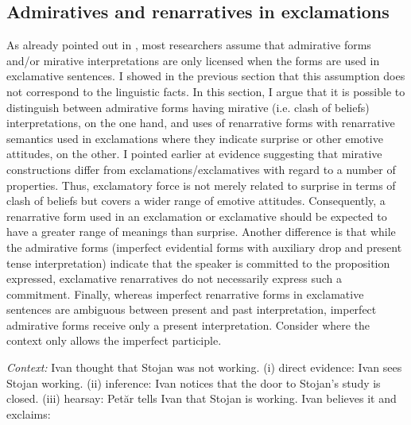 \documentclass[output=paper,
colorlinks,
citecolor=brown,
newtxmath
]{langscibook}
\begin{document}
\subsection{Admiratives and renarratives in exclamations}\label{sec:renarr_admir}

As already pointed out in , most researchers assume that admirative forms and/or mirative interpretations are only licensed when the forms are used in exclamative sentences. I showed in the previous section that this assumption does not correspond to the linguistic facts. In this section, I argue that it is possible to distinguish between admirative forms having mirative (i.e. clash of beliefs) interpretations, on the one hand, and uses of renarrative forms with renarrative semantics used in exclamations where they indicate surprise or other emotive attitudes, on the other. I pointed earlier at evidence suggesting that mirative constructions differ from exclamations/exclamatives with regard to a number of properties. Thus, exclamatory force is not merely related to surprise in terms of clash of beliefs but covers a wider range of emotive attitudes. Consequently, a renarrative form used in an exclamation or exclamative should be expected to have a greater range of meanings than surprise.
%
Another difference is that while the admirative forms (imperfect evidential forms with auxiliary drop and present tense interpretation) indicate that the speaker is committed to the proposition expressed, exclamative renarratives do not necessarily express such a commitment. Finally, whereas imperfect renarrative forms in exclamative sentences are ambiguous between present and past interpretation, imperfect admirative forms receive only a present interpretation. Consider  where the context only allows the imperfect participle.

\eanoraggedright\label{ex:Simeonova-rep}
\textit{Context:} Ivan thought that Stojan was not working. (i) direct evidence: Ivan sees Stojan working.
(ii) inference: Ivan notices that the door to Stojan's study is closed.
(iii) hearsay: Petăr tells Ivan that Stojan is working.
Ivan believes it and exclaims:\vspace{-6pt}
\z
\begin{exe}
\end{exe}
\end{document}

